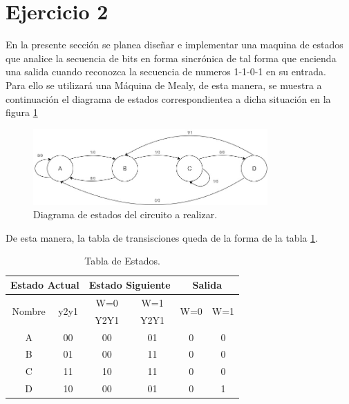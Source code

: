 \section{Ejercicio 2}
\noindent
En la presente sección se planea diseñar e implementar una maquina de estados que analice la secuencia de bits en forma sincrónica de tal forma que encienda una salida cuando reconozca la secuencia de numeros 1-1-0-1 en su entrada.\\
Para ello se utilizará una Máquina de Mealy, de esta manera, se muestra a continuación el diagrama de estados correspondientea a dicha situación en la figura \ref{ej2_estados}
%
\begin{figure}[H]
    \centering
    \includegraphics[width=0.8\textwidth]{figs/Ej2/diag_estados.jpg} %
    \caption{Diagrama de estados del circuito a realizar.}
    \label{ej2_estados}
\end{figure}
%
De esta manera, la tabla de transisciones queda de la forma de la tabla \ref{ej2_tabla1}.
%
\begin{table}[H]
\caption{Tabla de Estados.}
\label{ej2_tabla1}
\centering
\begin{tabular}{|c|c|c|c|c|c|}
\hline
\multicolumn{2}{|c|}{Estado Actual}             & \multicolumn{2}{c|}{Estado Siguiente} & \multicolumn{2}{c|}{Salida}                 \\ \hline
\multirow{2}{*}{Nombre} & \multirow{2}{*}{y2y1} & W=0               & W=1               & \multirow{2}{*}{W=0} & \multirow{2}{*}{W=1} \\ \cline{3-4}
                        &                       & Y2Y1              & Y2Y1              &                      &                      \\ \hline
A                       & 00                    & 00                & 01                & 0                    & 0                    \\ \hline
B                       & 01                    & 00                & 11                & 0                    & 0                    \\ \hline
C                       & 11                    & 10                & 11                & 0                    & 0                    \\ \hline
D                       & 10                    & 00                & 01                & 0                    & 1                    \\ \hline
\end{tabular}
\end{table}

